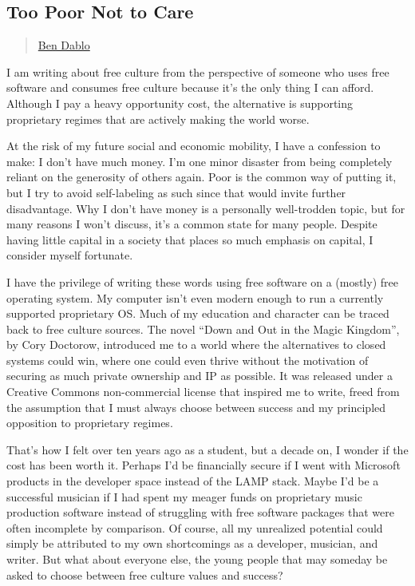\subsection{Too Poor Not to Care}\label{too-poor-not-to-care}

\begin{quote}
\hyperlink{ben-dablo}{Ben Dablo}
\end{quote}

I am writing about free culture from the perspective of someone who uses
free software and consumes free culture because it's the only thing I
can afford. Although I pay a heavy opportunity cost, the alternative is
supporting proprietary regimes that are actively making the world worse.

At the risk of my future social and economic mobility, I have a
confession to make: I don't have much money. I'm one minor disaster from
being completely reliant on the generosity of others again. Poor is the
common way of putting it, but I try to avoid self-labeling as such since
that would invite further disadvantage. Why I don't have money is a
personally well-trodden topic, but for many reasons I won't discuss,
it's a common state for many people. Despite having little capital in a
society that places so much emphasis on capital, I consider myself
fortunate.

I have the privilege of writing these words using free software on a
(mostly) free operating system. My computer isn't even modern enough to
run a currently supported proprietary OS. Much of my education and
character can be traced back to free culture sources. The novel ``Down
and Out in the Magic Kingdom'', by Cory Doctorow, introduced me to a
world where the alternatives to closed systems could win, where one
could even thrive without the motivation of securing as much private
ownership and IP as possible. It was released under a Creative Commons
non-commercial license that inspired me to write, freed from the
assumption that I must always choose between success and my principled
opposition to proprietary regimes.

That's how I felt over ten years ago as a student, but a decade on, I
wonder if the cost has been worth it. Perhaps I'd be financially secure
if I went with Microsoft products in the developer space instead of the
LAMP stack. Maybe I'd be a successful musician if I had spent my meager
funds on proprietary music production software instead of struggling
with free software packages that were often incomplete by comparison. Of
course, all my unrealized potential could simply be attributed to my own
shortcomings as a developer, musician, and writer. But what about
everyone else, the young people that may someday be asked to choose
between free culture values and success?

